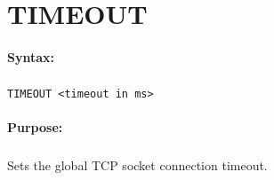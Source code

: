 
\newpage
\section{TIMEOUT}
\label{cmd:TIMEOUT}

\paragraph{Syntax:}
\subparagraph{}
\texttt{TIMEOUT <timeout in ms>}

\paragraph{Purpose:}
\subparagraph{}
Sets the global TCP socket connection timeout.

